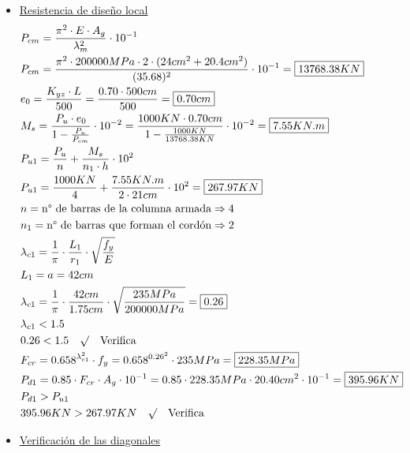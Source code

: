 \begin{enumerate}
\begin{itemize}
\item \underline{Resistencia de diseño local}
\begin{align*}
& P_{cm} = \frac{\pi^2 \cdot E \cdot A_g}{\lambda_m^2} \cdot 10^{-1}\\
& P_{cm} = \frac{\pi^2 \cdot 200000MPa \cdot 2 \cdot (24cm^2+20.4cm^2)}{(35.68)^2} \cdot 10^{-1} = \framebox{$13768.38KN$}\\
& e_0 = \frac{K_{yz} \cdot L}{500} = \frac{0.70 \cdot 500cm}{500} = \framebox{$0.70cm$} \\
& M_s = \frac{P_u \cdot e_0}{1-\frac{P_u}{P_{cm}}} \cdot 10^{-2} = \frac{1000KN \cdot 0.70cm}{1-\frac{1000KN}{13768.38KN}} \cdot 10^{-2} = \framebox{$ 7.55KN.m$} \\
& P_{u1} = \frac{P_u}{n} + \frac{M_s}{n_1 \cdot h} \cdot 10^2 \\
& P_{u1} = \frac{1000KN}{4} + \frac{7.55KN.m}{2 \cdot 21cm} \cdot 10^2 = \framebox{$267.97KN$}\\
& n = \text{n° de barras de la columna armada} \Rightarrow 4 \\
& n_1 = \text{n° de barras que forman el cordón} \Rightarrow 2 \\
& \lambda_{c1} = \frac{1}{\pi} \cdot \frac{L_1}{r_1} \cdot \sqrt{\frac{f_y}{E}} \\
& L_1 = a = 42cm \\
& \lambda_{c1} = \frac{1}{\pi} \cdot \frac{42cm}{1.75cm} \cdot \sqrt{\frac{235MPa}{200000MPa}} = \framebox{$0.26$} \\
& \lambda_{c1} < 1.5 \\
& 0.26 < 1.5 \quad \surd \quad \text{Verifica} \\
& F_{cr} = 0.658^{\lambda_{c1}^2} \cdot f_y = 0.658^{0.26^2} \cdot 235MPa = \framebox{$228.35MPa$}\\
& P_{d1} = 0.85 \cdot F_{cr} \cdot A_g \cdot 10^{-1} = 0.85 \cdot 228.35MPa \cdot 20.40cm^2 \cdot 10^{-1} = \framebox{$395.96KN$} \\
& P_{d1} > P_{u1} \\
& 395.96KN > 267.97KN \quad \surd \quad \text{Verifica} \\
\end{align*}
\newpage
\item \underline{Verificación de las diagonales}


\end{itemize}
\end{enumerate}
